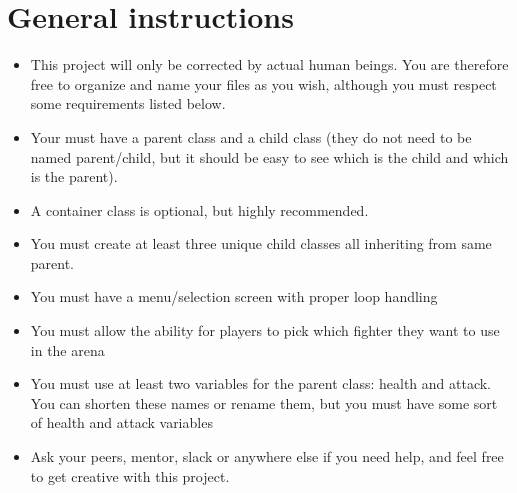 \documentclass{42-en}
\begin{document}
\chapter{General instructions}

	\begin{itemize}
		\item This project will only be corrected by actual human beings.
		You are therefore free to organize and name your files as you wish,
		although you must respect some requirements listed below.
		\item Your must have a parent class and a child class (they do not
		need to be named parent/child, but it should be easy to see
		which is the child and which is the parent).
		\item A container class is optional, but highly recommended.
		

		\item You must create at least three unique child classes all inheriting 
		from same parent.
		\item You must have a menu/selection screen with proper loop handling
		\item You must allow the ability for players to pick which fighter
		they want to use in the arena
		\item You must use at least two variables for the parent class:
		health and attack. You can shorten these names or rename them, but
		you must have some sort of health and attack variables
		\item Ask your peers, mentor, slack or anywhere else if you need
		help, and feel free to get creative with this project.\\
	\end{itemize}

\end{document}
